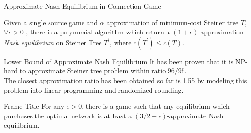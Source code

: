 \documentclass[11pt,aspectratio=169]{beamer}
\begin{document}
\begin{frame}{Approximate Nash Equilibrium in Connection Game}
\begin{theorem}
	Given a single source game and \(\alpha\) approximation of minimum-cost Steiner tree \(T\), \(\forall \epsilon > 0\) , there is a polynomial algorithm which return a \((1+\epsilon)\)-approximation \textit{Nash equilibrium} on Steiner Tree \(T^{'}\), where $c(T^{'}) \leq c(T)$.
\end{theorem}
\end{frame}

\begin{frame}{Lower Bound of Approximate Nash Equilibrium}
It has been proven that it is NP-hard to approximate Steiner tree problem within ratio \(96/95\). \\
The closest approximation ratio has been obtained so far is 1.55 by modeling this problem into linear programming and randomized rounding. 
\end{frame}

\begin{frame}{Frame Title}
For any $\epsilon > 0$, there is a game such that any equilibrium which purchases the optimal network is at least a $(3/2-\epsilon)$-approximate Nash equilibrium.
\end{frame}
\end{document}
